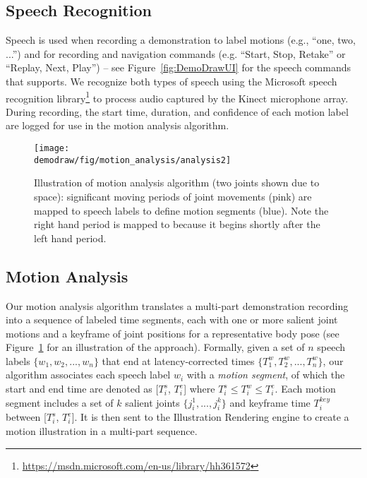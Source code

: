 
\subsection{Speech Recognition}
Speech is used when recording a demonstration to label motions (e.g., ``one, two, ...'') and for recording and navigation commands (e.g. ``Start, Stop, Retake'' or ``Replay, Next, Play'') -- see Figure~\ref{fig:DemoDrawUI} for the speech commands that \systemname{} supports.
%
We recognize both types of speech using the Microsoft speech recognition library\footnote{\url{https://msdn.microsoft.com/en-us/library/hh361572}} to process audio captured by the Kinect microphone array.
During recording, the start time, duration, and confidence of each motion label are logged for use in the motion analysis algorithm.


\begin{figure}[!t]
  \centering
  \texttt{[image: \\demodraw/fig/motion\_analysis/analysis2]}
  \caption{Illustration of motion analysis algorithm (two joints shown due to space): significant moving periods of joint movements (pink) are mapped to speech labels to define motion segments (blue). Note the right hand period is mapped to  because it begins shortly after the left hand period.}
   \label{fig:segmentation}
\end{figure}

\subsection {Motion Analysis}

Our motion analysis algorithm translates a multi-part demonstration recording into a sequence of labeled time segments, each with one or more salient joint motions and a keyframe of joint positions for a representative body pose (see Figure~\ref{fig:segmentation} for an illustration of the approach).
Formally, given a set of $n$ speech labels $\{w_1, w_2, ..., w_n\}$ that end at latency-corrected times $\{T_1^w, T_2^w, ..., T_n^w\}$, our algorithm associates each speech label $w_i$ with a \emph{motion segment}, of which the start and end time are denoted as [$T_i^s$, $T_i^e$] where $T_i^s \leq T_i^w \leq T_i^e$. Each motion segment includes a set of $k$ salient joints $\{j_i^1, ..., j_i^k\}$ and keyframe time $T_i^{key}$ between [$T_i^s$, $T_i^e$].
It is then sent to the Illustration Rendering engine to create a motion illustration in a multi-part sequence.

